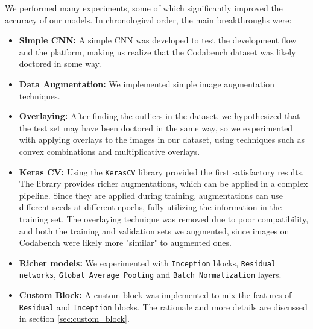 \documentclass[11pt]{article}
\begin{document}
\begin{multicols}{2}
      We performed many experiments, some of which significantly improved the accuracy of our models. In chronological order, the main breakthroughs were:
      \begin{itemize}[leftmargin=*]
            \setlength\itemsep{0em}
            \item \textbf{Simple CNN:} A simple CNN was developed to test the development flow and the platform, making us realize that the Codabench dataset was likely doctored in some way.
            \item \textbf{Data Augmentation:} We implemented simple image augmentation techniques.
            \item \textbf{Overlaying:} After finding the outliers in the dataset, we hypothesized that the test set may have been doctored in the same way, so we experimented with applying overlays to the images in our dataset, using techniques such as convex combinations and multiplicative overlays.
            \item \textbf{Keras CV:} Using the \texttt{KerasCV} library\cite{chollet2015keras} provided the first satisfactory results. The library provides richer augmentations, which can be applied in a complex pipeline. Since they are applied during training, augmentations can use different seeds at different epochs, fully utilizing the information in the training set. The overlaying technique was removed due to poor compatibility, and both the training and validation sets we augmented, since images on Codabench were likely more "similar" to augmented ones.
            \item \textbf{Richer models:} We experimented with \texttt{In\-cep\-tion} blocks\cite{Inception}, \texttt{Re\-si\-dual net\-works}\cite{He2015DeepRL}, \texttt{Glo\-bal Aver\-age Poo\-ling} and \texttt{Batch Nor\-ma\-li\-za\-tion} layers.
            \item \textbf{Custom Block:} A custom block was implemented to mix the features of \texttt{Re\-si\-dual} and \texttt{In\-cep\-tion} blocks. The rationale and more details are discussed in section \ref{sec:custom_block}.
      \end{itemize}


\end{multicols}
\end{document}
